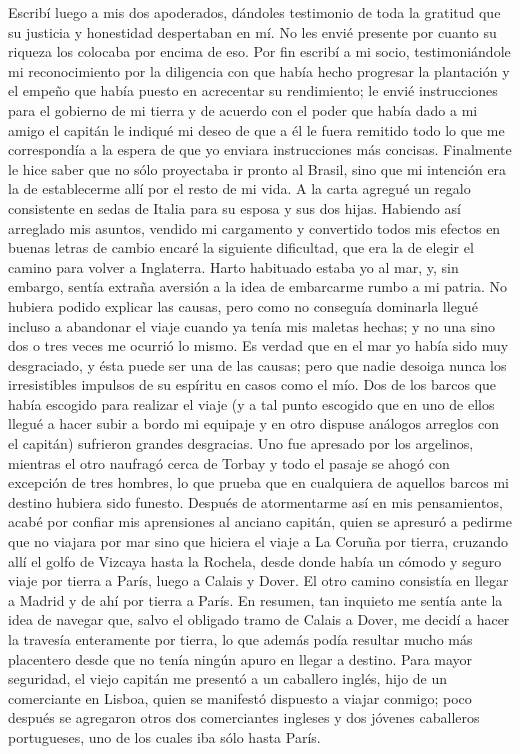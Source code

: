 \documentclass{novela}
\begin{document}
    Escribí luego a mis dos apoderados, dándoles testimonio de toda la gratitud que su justicia y honestidad despertaban en mí. No les envié presente por cuanto su riqueza los colocaba por encima de eso.
    Por fin escribí a mi socio, testimoniándole mi reconocimiento por la diligencia con que había hecho progresar la plantación y el empeño que había puesto en acrecentar su rendimiento; le envié instrucciones para el gobierno de mi tierra y de acuerdo con el poder que había dado a mi amigo el capitán le indiqué mi deseo de que a él le fuera remitido todo lo que me correspondía a la espera de que yo enviara instrucciones más concisas.
    Finalmente le hice saber que no sólo proyectaba ir pronto al Brasil, sino que mi intención era la de establecerme allí por el resto de mi vida. A la carta agregué un regalo consistente en sedas de Italia para su esposa y sus dos hijas.
    Habiendo así arreglado mis asuntos, vendido mi cargamento y convertido todos mis efectos en buenas letras de cambio encaré la siguiente dificultad, que era la de elegir el camino para volver a Inglaterra. Harto habituado estaba yo al mar, y, sin embargo, sentía extraña aversión a la idea de embarcarme rumbo a mi patria. No hubiera podido explicar las causas, pero como no conseguía dominarla llegué incluso a abandonar el viaje cuando ya tenía mis maletas hechas; y no una sino dos o tres veces me ocurrió lo mismo.
    Es verdad que en el mar yo había sido muy desgraciado, y ésta puede ser una de las causas; pero que nadie desoiga nunca los irresistibles impulsos de su espíritu en casos como el mío. Dos de los barcos que había escogido para realizar el viaje (y a tal punto escogido que en uno de ellos llegué a hacer subir a bordo mi equipaje y en otro dispuse análogos arreglos con el capitán) sufrieron grandes desgracias. Uno fue apresado por los argelinos, mientras el otro naufragó cerca de Torbay y todo el pasaje se ahogó con excepción de tres hombres, lo que prueba que en cualquiera de aquellos barcos mi destino hubiera sido funesto.
    Después de atormentarme así en mis pensamientos, acabé por confiar mis aprensiones al anciano capitán, quien se apresuró a pedirme que no viajara por mar sino que hiciera el viaje a La Coruña por tierra, cruzando allí el golfo de Vizcaya hasta la Rochela, desde donde había un cómodo y seguro viaje por tierra a París, luego a Calais y Dover. El otro camino consistía en llegar a Madrid y de ahí por tierra a París.
    En resumen, tan inquieto me sentía ante la idea de navegar que, salvo el obligado tramo de Calais a Dover, me decidí a hacer la travesía enteramente por tierra, lo que además podía resultar mucho más placentero desde que no tenía ningún apuro en llegar a destino. Para mayor seguridad, el viejo capitán me presentó a un caballero inglés, hijo de un comerciante en Lisboa, quien se manifestó dispuesto a viajar conmigo; poco después se agregaron otros dos comerciantes ingleses y dos jóvenes caballeros portugueses, uno de los cuales iba sólo hasta París.
\end{document}
